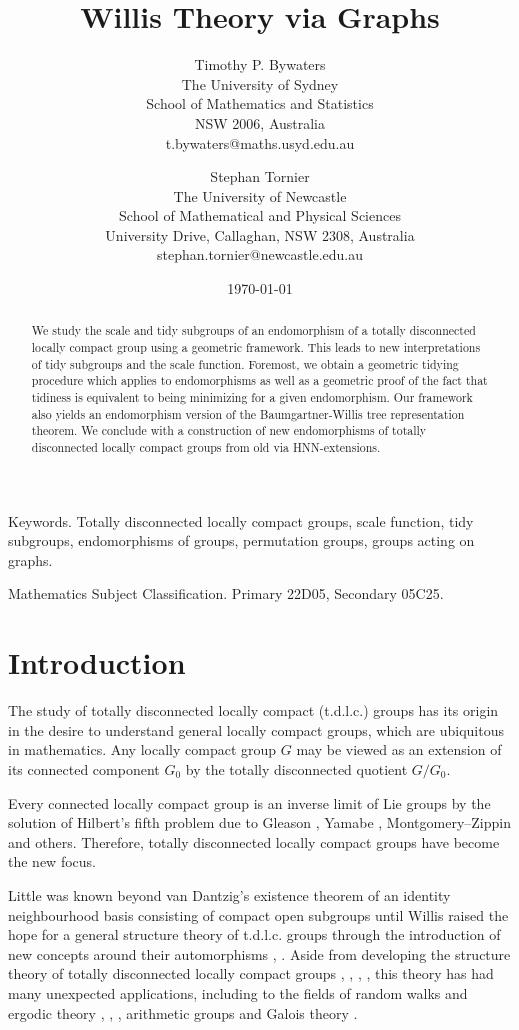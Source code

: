 \documentclass{article}
\title{Willis Theory via Graphs}
\author{Timothy P. Bywaters \\ The University of Sydney \\ School of Mathematics and Statistics \\ NSW 2006, Australia \\ t.bywaters@maths.usyd.edu.au \and Stephan Tornier \\ The University of Newcastle \\ School of Mathematical and Physical Sciences \\ University Drive, Callaghan, NSW 2308, Australia \\ stephan.tornier@newcastle.edu.au}
\date{\today}
\theoremstyle{definition}
\begin{document}
\maketitle
\begin{abstract}
We study the scale and tidy subgroups of an endomorphism of a totally disconnected locally compact group using a geometric framework. This leads to new interpretations of tidy subgroups and the scale function. Foremost, we obtain a geometric tidying procedure which applies to endomorphisms as well as a geometric proof of the fact that tidiness is equivalent to being minimizing for a given endomorphism. Our framework also yields an endomorphism version of the Baumgartner-Willis tree representation theorem. We conclude with a construction of new endomorphisms of totally disconnected locally compact groups from old via HNN-extensions.
\end{abstract}

\vspace{0.6cm}
\noindent
Keywords. Totally disconnected locally compact groups, scale function, tidy subgroups, endomorphisms of groups, permutation groups, groups acting on graphs.

\vspace{0.2cm}
 Mathematics Subject Classification. Primary 22D05, Secondary 05C25.


\section{Introduction}

The study of totally disconnected locally compact (t.d.l.c.) groups has its origin in the desire to understand general locally compact groups, which are ubiquitous in mathematics. Any locally compact group $G$ may be viewed as an extension of its connected component $G_{0}$ by the totally disconnected quotient $G/G_{0}$.

Every connected locally compact group is an inverse limit of Lie groups by the solution of Hilbert's fifth problem due to Gleason \cite{Gle52}, Yamabe \cite{Yam53}, Montgomery--Zippin \cite{MZ52} and others. Therefore, totally disconnected locally compact groups have become the new focus.

\vspace{0.2cm}

Little was known beyond van Dantzig's existence theorem of an identity neighbourhood basis consisting of compact open subgroups \cite{vDa31} until Willis raised the hope for a general structure theory of t.d.l.c. groups through the introduction of new concepts around their automorphisms \cite{Wil94}, \cite{Wil01}. Aside from developing the structure theory of totally disconnected locally compact groups \cite{Wil04}, \cite{BW06}, \cite{Wil07}, \cite{BRW12}, this theory has had many unexpected applications, including to the fields of random walks and ergodic theory \cite{DSW06}, \cite{JRW96}, \cite{PW03}, arithmetic groups \cite{SW13} and Galois theory \cite{CH09}.
\end{document}
